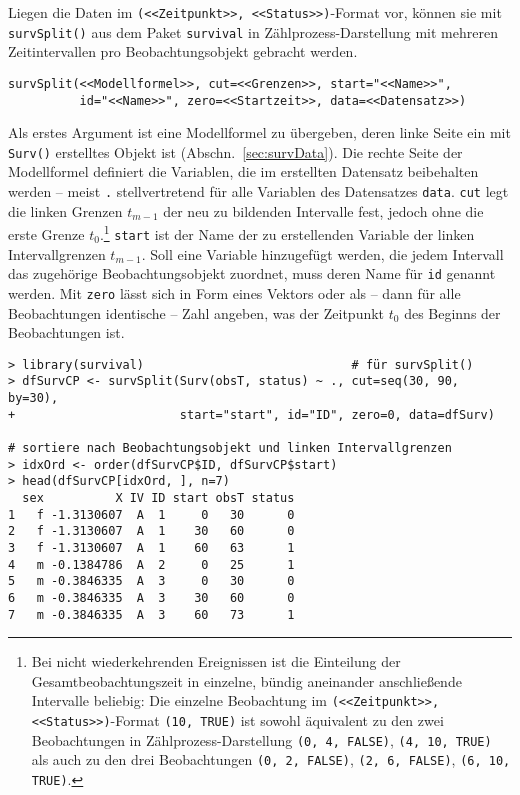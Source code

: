 Liegen die Daten im \lstinline!(<<Zeitpunkt>>, <<Status>>)!-Format vor, können sie mit \lstinline!survSplit()! aus dem Paket \lstinline!survival! in Zählprozess-Darstellung mit mehreren Zeitintervallen pro Beobachtungsobjekt gebracht werden.
\begin{lstlisting}
survSplit(<<Modellformel>>, cut=<<Grenzen>>, start="<<Name>>",
          id="<<Name>>", zero=<<Startzeit>>, data=<<Datensatz>>)
\end{lstlisting}

Als erstes Argument ist eine Modellformel zu übergeben, deren linke Seite ein mit \lstinline!Surv()! erstelltes Objekt ist (Abschn.\ \ref{sec:survData}). Die rechte Seite der Modellformel definiert die Variablen, die im erstellten Datensatz beibehalten werden -- meist \lstinline!.! stellvertretend für alle Variablen des Datensatzes \lstinline!data!. \lstinline!cut! legt die linken Grenzen $t_{m-1}$ der neu zu bildenden Intervalle fest, jedoch ohne die erste Grenze $t_{0}$.\footnote{Bei nicht wiederkehrenden Ereignissen ist die Einteilung der Gesamtbeobachtungszeit in einzelne, bündig aneinander anschließende Intervalle beliebig: Die einzelne Beobachtung im \lstinline!(<<Zeitpunkt>>, <<Status>>)!-Format \lstinline!(10, TRUE)! ist sowohl äquivalent zu den zwei Beobachtungen in Zählprozess-Darstellung \lstinline!(0, 4, FALSE)!, \lstinline!(4, 10, TRUE)! als auch zu den drei Beobachtungen \lstinline!(0, 2, FALSE)!, \lstinline!(2, 6, FALSE)!, \lstinline!(6, 10, TRUE)!.} \lstinline!start! ist der Name der zu erstellenden Variable der linken Intervallgrenzen $t_{m-1}$. Soll eine Variable hinzugefügt werden, die jedem Intervall das zugehörige Beobachtungsobjekt zuordnet, muss deren Name für \lstinline!id! genannt werden. Mit \lstinline!zero! lässt sich in Form eines Vektors oder als -- dann für alle Beobachtungen identische -- Zahl angeben, was der Zeitpunkt $t_{0}$ des Beginns der Beobachtungen ist.
\begin{lstlisting}
> library(survival)                             # für survSplit()
> dfSurvCP <- survSplit(Surv(obsT, status) ~ ., cut=seq(30, 90, by=30),
+                       start="start", id="ID", zero=0, data=dfSurv)

# sortiere nach Beobachtungsobjekt und linken Intervallgrenzen
> idxOrd <- order(dfSurvCP$ID, dfSurvCP$start)
> head(dfSurvCP[idxOrd, ], n=7)
  sex          X IV ID start obsT status
1   f -1.3130607  A  1     0   30      0
2   f -1.3130607  A  1    30   60      0
3   f -1.3130607  A  1    60   63      1
4   m -0.1384786  A  2     0   25      1
5   m -0.3846335  A  3     0   30      0
6   m -0.3846335  A  3    30   60      0
7   m -0.3846335  A  3    60   73      1
\end{lstlisting}


